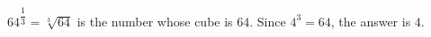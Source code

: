 $64^{\dfrac13}=\sqrt[3]{64}$ is the number whose cube is $64$. Since $4^3=64$, the answer is $\boxed{4}$.
